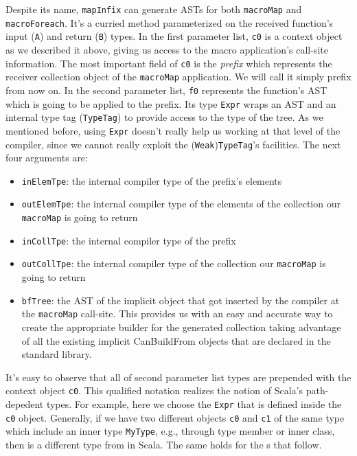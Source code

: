 Despite its name,
\texttt{mapInfix} can generate ASTs for both \texttt{macroMap} and \texttt{macroForeach}. It's a curried
method parameterized on the received function's input (\texttt{A}) and return (\texttt{B}) types.
In the first parameter list, \texttt{c0} is a context object as we described it above,
giving us access to the macro application's call-site information. The most
important field of \texttt{c0} is the \emph{prefix} which represents the receiver collection
object of the \texttt{macroMap} application. We will call it simply prefix
from now on. In the second parameter
list, \texttt{f0} represents the function's AST which is going to be applied to the
prefix. Its type \texttt{Expr} wraps an AST and an internal type tag
(\texttt{TypeTag}) to provide access to the type of the tree. As we mentioned
before, using \texttt{Expr} doesn't really help us working at that level of the
compiler, since we cannot really exploit the (\texttt{Weak})\texttt{TypeTag}'s facilities. The
next four arguments are:
\begin{itemize}
 \item
  \texttt{inElemTpe}: the internal compiler type of the prefix's elements
 \item
  \texttt{outElemTpe}: the internal compiler type of the elements of the collection our
\texttt{macroMap} is going to return
 \item
  \texttt{inCollTpe}: the internal compiler type of the prefix
 \item
  \texttt{outCollTpe}: the internal compiler type of the collection our \texttt{macroMap} is going
to return
 \item
  \texttt{bfTree}: the AST of the implicit   object that got
inserted by the compiler at the \texttt{macroMap} call-site. This provides us with an
easy and accurate way to create the appropriate builder for the generated
collection taking advantage of all the existing implicit CanBuildFrom objects
that are declared in the standard library.
\end{itemize}

It's easy to observe that all of second parameter list types are prepended
with the context object \texttt{c0}. This qualified notation realizes the notion of
Scala's path-depedent types. For example, here we choose the \texttt{Expr} that is
defined inside the \texttt{c0} object. Generally, if we have two different objects \texttt{c0} and
\texttt{c1} of the same type which include an inner type \texttt{MyType}, e.g., through type
member or inner class,  then  is a different type from  in
Scala. The same holds for the s that follow.


